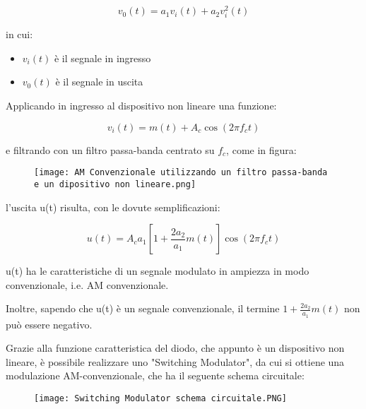 {
    \Large 
    \begin{equation}
        v_0 (t)
        = 
        a_1 v_i (t)
        + 
        a_2 v_i^{2} (t)
    \end{equation}
}

in cui: 

\begin{itemize}
    \item $v_i (t)$ è il segnale in ingresso 
    \item $v_0 (t)$ è il segnale in uscita
\end{itemize}

Applicando in ingresso al dispositivo non lineare una funzione: 

{
    \Large
    \begin{equation}
        v_i (t)
        = 
        m(t) + A_c \cos(2 \pi f_c t)
    \end{equation}
} 

e filtrando con un filtro passa-banda centrato su $f_c$, come in figura: 

\begin{figure}[h]
    \centering
    \texttt{[image: AM Convenzionale utilizzando un filtro passa-banda e un dipositivo non lineare.png]}
\end{figure} 

l'uscita u(t) risulta, con le dovute semplificazioni: 

{
    \Large 
    \begin{equation}
        u(t)
        = 
        A_c a_1 \left[1 + \frac{2a_2}{a_1} m(t)\right] \cos(2 \pi f_c t)
    \end{equation}
}

u(t) ha le caratteristiche di un segnale modulato in ampiezza in modo convenzionale, 
i.e. AM convenzionale. \newline 

Inoltre, sapendo che u(t) è un segnale convenzionale, il termine $1 + \frac{2a_2}{a_1} m(t)$ non può essere negativo. \newline 

Grazie alla funzione caratteristica del diodo, che appunto è un dispositivo non lineare, 
è possibile realizzare uno "Switching Modulator", da cui si ottiene una modulazione AM-convenzionale, 
che ha il seguente schema circuitale: 

\begin{figure}[h]
    \centering
    \texttt{[image: Switching Modulator schema circuitale.PNG]}
\end{figure} 

